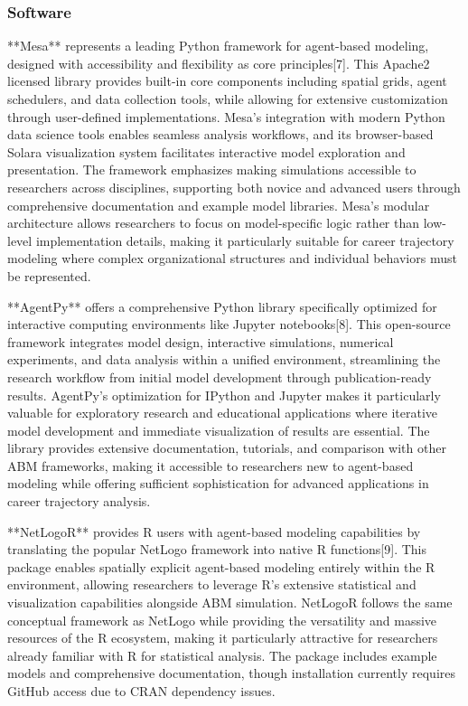 \documentclass[main.tex]{subfiles}
\begin{document}
\subsubsection{Software}

**Mesa** represents a leading Python framework for agent-based modeling, designed with accessibility and flexibility as core principles[7]. This Apache2 licensed library provides built-in core components including spatial grids, agent schedulers, and data collection tools, while allowing for extensive customization through user-defined implementations. Mesa's integration with modern Python data science tools enables seamless analysis workflows, and its browser-based Solara visualization system facilitates interactive model exploration and presentation. The framework emphasizes making simulations accessible to researchers across disciplines, supporting both novice and advanced users through comprehensive documentation and example model libraries. Mesa's modular architecture allows researchers to focus on model-specific logic rather than low-level implementation details, making it particularly suitable for career trajectory modeling where complex organizational structures and individual behaviors must be represented.

**AgentPy** offers a comprehensive Python library specifically optimized for interactive computing environments like Jupyter notebooks[8]. This open-source framework integrates model design, interactive simulations, numerical experiments, and data analysis within a unified environment, streamlining the research workflow from initial model development through publication-ready results. AgentPy's optimization for IPython and Jupyter makes it particularly valuable for exploratory research and educational applications where iterative model development and immediate visualization of results are essential. The library provides extensive documentation, tutorials, and comparison with other ABM frameworks, making it accessible to researchers new to agent-based modeling while offering sufficient sophistication for advanced applications in career trajectory analysis.

**NetLogoR** provides R users with agent-based modeling capabilities by translating the popular NetLogo framework into native R functions[9]. This package enables spatially explicit agent-based modeling entirely within the R environment, allowing researchers to leverage R's extensive statistical and visualization capabilities alongside ABM simulation. NetLogoR follows the same conceptual framework as NetLogo while providing the versatility and massive resources of the R ecosystem, making it particularly attractive for researchers already familiar with R for statistical analysis. The package includes example models and comprehensive documentation, though installation currently requires GitHub access due to CRAN dependency issues.
\end{document}
